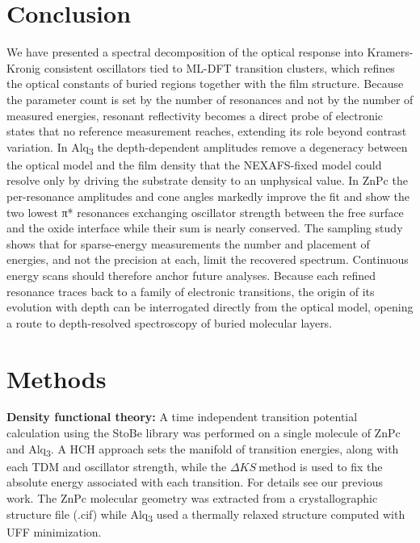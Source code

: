 \section{Conclusion}\label{sec:conclusion}

We have presented a spectral decomposition of the optical response into Kramers-Kronig consistent oscillators tied to ML-DFT transition clusters, which refines the optical constants of buried regions together with the film structure. Because the parameter count is set by the number of resonances and not by the number of measured energies, resonant reflectivity becomes a direct probe of electronic states that no reference measurement reaches, extending its role beyond contrast variation. In Alq\textsubscript{3} the depth-dependent amplitudes remove a degeneracy between the optical model and the film density that the NEXAFS-fixed model could resolve only by driving the substrate density to an unphysical value. In ZnPc the per-resonance amplitudes and cone angles markedly improve the fit and show the two lowest π* resonances exchanging oscillator strength between the free surface and the oxide interface while their sum is nearly conserved. The sampling study shows that for sparse-energy measurements the number and placement of energies, and not the precision at each, limit the recovered spectrum. Continuous energy scans should therefore anchor future analyses. Because each refined resonance traces back to a family of electronic transitions, the origin of its evolution with depth can be interrogated directly from the optical model, opening a route to depth-resolved spectroscopy of buried molecular layers.

\section{Methods}\label{sec:methods-1}

\textbf{Density functional theory:} A time independent transition potential calculation using the StoBe library was performed on a single molecule of ZnPc and Alq\textsubscript{3}. A HCH approach sets the manifold of transition energies, along with each TDM and oscillator strength, while the \(\Delta KS\ \)method is used to fix the absolute energy associated with each transition. For details see our previous work.\autocite{murciaQuantitativeBondTraceableResonant2026} The ZnPc molecular geometry was extracted from a crystallographic structure file (.cif)\autocite{maiDataDensityFunction2020} while Alq\textsubscript{3} used a thermally relaxed structure computed with UFF minimization.


